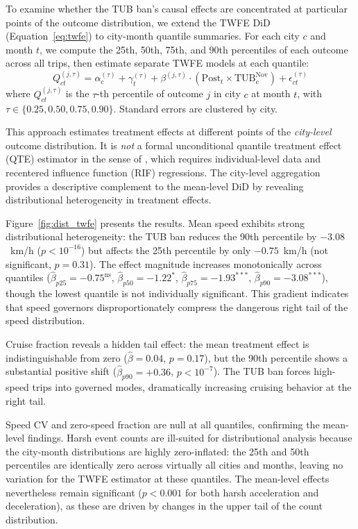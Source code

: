 To examine whether the TUB ban's causal effects are concentrated at particular points of the outcome distribution, we extend the TWFE DiD (Equation~\ref{eq:twfe}) to city-month quantile summaries. For each city $c$ and month $t$, we compute the 25th, 50th, 75th, and 90th percentiles of each outcome across all trips, then estimate separate TWFE models at each quantile:
\begin{equation}
    Q_{ct}^{(j,\tau)} = \alpha_c^{(\tau)} + \gamma_t^{(\tau)} + \beta^{(j,\tau)} \cdot (\text{Post}_t \times \text{TUB}^{\text{Nov}}_c) + \epsilon_{ct}^{(\tau)}
    \label{eq:dist_twfe}
\end{equation}
where $Q_{ct}^{(j,\tau)}$ is the $\tau$-th percentile of outcome $j$ in city $c$ at month $t$, with $\tau \in \{0.25, 0.50, 0.75, 0.90\}$. Standard errors are clustered by city.

This approach estimates treatment effects at different points of the \textit{city-level} outcome distribution. It is \textit{not} a formal unconditional quantile treatment effect (QTE) estimator in the sense of \citet{firpo2009unconditional}, which requires individual-level data and recentered influence function (RIF) regressions. The city-level aggregation provides a descriptive complement to the mean-level DiD by revealing distributional heterogeneity in treatment effects.

Figure~\ref{fig:dist_twfe} presents the results. Mean speed exhibits strong distributional heterogeneity: the TUB ban reduces the 90th percentile by $-3.08$~km/h ($p < 10^{-16}$) but affects the 25th percentile by only $-0.75$~km/h (not significant, $p = 0.31$). The effect magnitude increases monotonically across quantiles ($\hat{\beta}_{p25} = -0.75^{\text{ns}}$, $\hat{\beta}_{p50} = -1.22^{*}$, $\hat{\beta}_{p75} = -1.93^{***}$, $\hat{\beta}_{p90} = -3.08^{***}$), though the lowest quantile is not individually significant. This gradient indicates that speed governors disproportionately compress the dangerous right tail of the speed distribution.

Cruise fraction reveals a hidden tail effect: the mean treatment effect is indistinguishable from zero ($\hat{\beta} = 0.04$, $p = 0.17$), but the 90th percentile shows a substantial positive shift ($\hat{\beta}_{p90} = +0.36$, $p < 10^{-7}$). The TUB ban forces high-speed trips into governed modes, dramatically increasing cruising behavior at the right tail.

Speed CV and zero-speed fraction are null at all quantiles, confirming the mean-level findings. Harsh event counts are ill-suited for distributional analysis because the city-month distributions are highly zero-inflated: the 25th and 50th percentiles are identically zero across virtually all cities and months, leaving no variation for the TWFE estimator at these quantiles. The mean-level effects nevertheless remain significant ($p < 0.001$ for both harsh acceleration and deceleration), as these are driven by changes in the upper tail of the count distribution.

